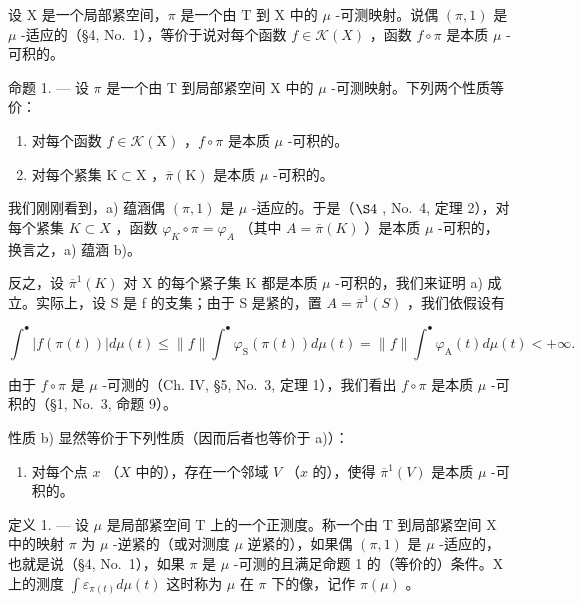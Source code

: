 设 X 是一个局部紧空间，\(\pi\) 是一个由 T 到 X 中的 \(\mu\) -可测映射。说偶 \((\pi,1)\) 是 \(\mu\) -适应的（§4, No.~1），等价于说对每个函数 \(f \in \mathcal{K}(X)\) ，函数 \(f \circ \pi\) 是本质 \(\mu\) -可积的。

命题 1. --- 设 \(\pi\) 是一个由 T 到局部紧空间 X 中的 \(\mu\) -可测映射。下列两个性质等价：

\begin{enumerate}
\def\labelenumi{\alph{enumi})}
\item
  对每个函数 \(f \in \mathcal{K}(\mathrm{X})\) ，\(f \circ \pi\) 是本质 \(\mu\) -可积的。
\item
  对每个紧集 \(\mathrm{K}\subset \mathrm{X}\) ，\(\overline{\pi} (\mathrm{K})\) 是本质 \(\mu\) -可积的。
\end{enumerate}

我们刚刚看到，a) 蕴涵偶 \((\pi,1)\) 是 \(\mu\) -适应的。于是（\(\S4\) , No.~4, 定理 2），对每个紧集 \(K\subset X\) ，函数 \(\varphi_{K}\circ\pi=\varphi_{A}\) （其中 \(A=\overline{\pi}(K)\) ）是本质 \(\mu\) -可积的，换言之，a) 蕴涵 b)。

反之，设 \(\overline{\pi}^{1}(K)\) 对 X 的每个紧子集 K 都是本质 \(\mu\) -可积的，我们来证明 a) 成立。实际上，设 S 是 f 的支集；由于 S 是紧的，置 \(A = \overline{\pi}^{1}(S)\) ，我们依假设有

\[
\int^ {\bullet} \left| f (\pi (t)) \right| d \mu (t) \leqslant \| f \| \int^ {\bullet} \varphi_ {\mathrm{S}} (\pi (t)) d \mu (t) = \| f \| \int^ {\bullet} \varphi_ {\mathrm{A}} (t) d \mu (t) <   + \infty .
\]

由于 \(f \circ \pi\) 是 \(\mu\) -可测的（Ch. IV, §5, No.~3, 定理 1），我们看出 \(f \circ \pi\) 是本质 \(\mu\) -可积的（§1, No.~3, 命题 9）。

性质 b) 显然等价于下列性质（因而后者也等价于 a)）：

\begin{enumerate}
\def\labelenumi{\alph{enumi})}
\setcounter{enumi}{2}
\tightlist
\item
  对每个点 \(x\) （\(X\) 中的），存在一个邻域 \(V\) （\(x\) 的），使得 \(\overline{\pi}^1(V)\) 是本质 \(\mu\) -可积的。
\end{enumerate}

定义 1. --- 设 \(\mu\) 是局部紧空间 T 上的一个正测度。称一个由 T 到局部紧空间 X 中的映射 \(\pi\) 为 \(\mu\) -逆紧的（或对测度 \(\mu\) 逆紧的），如果偶 \((\pi,1)\) 是 \(\mu\) -适应的，也就是说（§4, No.~1），如果 \(\pi\) 是 \(\mu\) -可测的且满足命题 1 的（等价的）条件。X 上的测度 \(\int \varepsilon_{\pi(t)} d\mu(t)\) 这时称为 \(\mu\) 在 \(\pi\) 下的像，记作 \(\pi(\mu)\) 。


